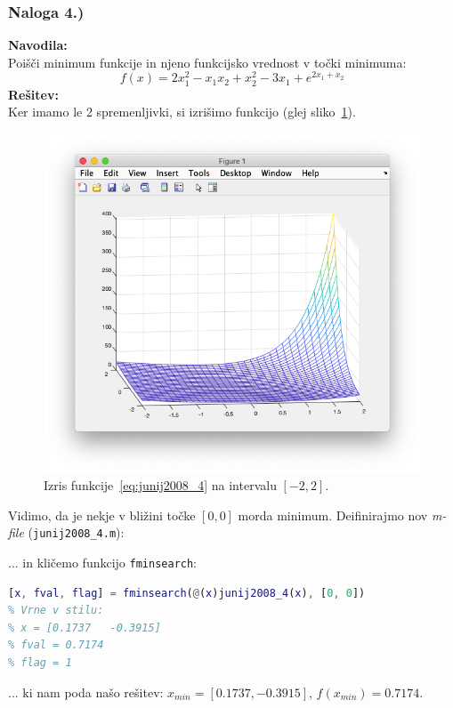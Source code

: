 \documentclass[a4paper,11pt]{article}
\begin{document}
\subsubsection{Naloga 4.)}
\label{task:junij2008_4}

\textbf{Navodila:} \\
Poišči minimum funkcije in njeno funkcijsko vrednost v točki minimuma:
\begin{equation} \label{eq:junij2008_4}
	f(x) = 2x_1^2 - x_1x_2 + x_2^2 - 3x_1 + e^{2x_1 + x_2}
\end{equation}
\textbf{Rešitev:} \\
Ker imamo le 2 spremenljivki, si izrišimo funkcijo (glej sliko~\ref{img:junij2008_4_plot}). 

\begin{figure}[hbt]
	\centering
	\includegraphics[scale=.4]{images/junij2008_4_plot.png}
	\caption{Izris funkcije~\ref{eq:junij2008_4} na intervalu $[-2, 2]$.}
	\label{img:junij2008_4_plot}
\end{figure}
Vidimo, da je nekje v bližini točke $[0, 0]$ morda minimum. Deifinirajmo nov \textit{m-file} (\texttt{junij2008\_4.m}):

... in kličemo funkcijo \texttt{fminsearch}:

\begin{lstlisting}[language=Matlab]
[x, fval, flag] = fminsearch(@(x)junij2008_4(x), [0, 0])
% Vrne v stilu:
% x = [0.1737   -0.3915]
% fval = 0.7174
% flag = 1
\end{lstlisting}
... ki nam poda našo rešitev: $x_{min} =  [0.1737, -0.3915]$, $f(x_{min}) = 0.7174$.
\end{document}
